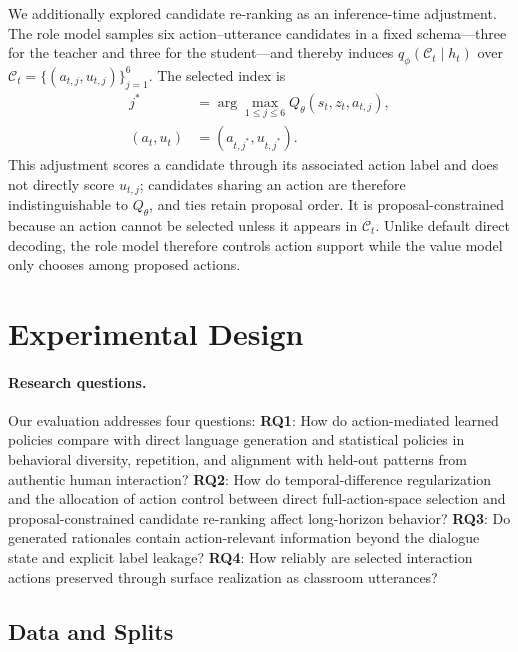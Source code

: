 \documentclass[manuscript,review,anonymous]{acmart}
\begin{document}
We additionally explored candidate re-ranking as an inference-time adjustment. The role model samples six action--utterance candidates in a fixed schema---three for the teacher and three for the student---and thereby induces $q_\phi(\mathcal C_t\mid h_t)$ over $\mathcal{C}_t=\{(a_{t,j},u_{t,j})\}_{j=1}^{6}$. The selected index is
\begin{equation}
\begin{aligned}
j^*&=\arg\max_{1\leq j\leq 6}Q_\theta(s_t,z_t,a_{t,j}),\\
(a_t,u_t)&=(a_{t,j^*},u_{t,j^*}).
\end{aligned}
\label{eq:proposal-constrained-selection}
\end{equation}
This adjustment scores a candidate through its associated action label and does not directly score $u_{t,j}$; candidates sharing an action are therefore indistinguishable to $Q_\theta$, and ties retain proposal order. It is proposal-constrained because an action cannot be selected unless it appears in $\mathcal C_t$. Unlike default direct decoding, the role model therefore controls action support while the value model only chooses among proposed actions.

\section{Experimental Design}
\label{sec:experiments}

\paragraph{Research questions.}
Our evaluation addresses four questions:
\textbf{RQ1}: How do action-mediated learned policies compare with direct
language generation and statistical policies in behavioral diversity,
repetition, and alignment with held-out patterns from authentic human
interaction?
\textbf{RQ2}: How do temporal-difference regularization and the allocation of
action control between direct full-action-space selection and
proposal-constrained candidate re-ranking affect long-horizon behavior?
\textbf{RQ3}: Do generated rationales contain action-relevant information beyond the dialogue state and explicit label leakage?
\textbf{RQ4}: How reliably are selected interaction actions preserved through
surface realization as classroom utterances?

\subsection{Data and Splits}
\end{document}
